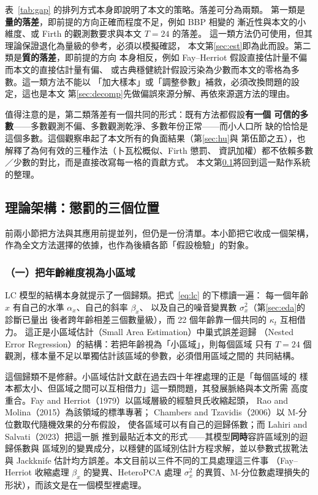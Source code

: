 \documentclass[UTF8, fontset=macnew, a4paper, 12pt]{ctexart}
\newcommand{\cn}[1]{\ding{\number\numexpr171+#1\relax}}
\begin{document}
表~\ref{tab:gap} 的排列方式本身即說明了本文的策略。落差可分為兩類。
第一類是\textbf{量的落差}，即前提的方向正確而程度不足，例如 BBP 相變的
漸近性與本文的小維度、或 Firth 的觀測數要求與本文 $T=24$ 的落差。
這一類方法仍可使用，但其理論保證退化為量級的參考，必須以模擬確認，
本文第\ref{sec:est}即為此而設。第二類是\textbf{質的落差}，即前提的方向
本身相反，例如 Fay--Herriot 假設直接估計量不偏而本文的直接估計量有偏、
或古典穩健統計假設污染為少數而本文的零格為多數。這一類方法不能以
「加大樣本」或「調整參數」補救，必須改換問題的設定，這也是本文
第\ref{sec:decomp}先做偏誤來源分解、再依來源選方法的理由。

值得注意的是，第二類落差有一個共同的形式：既有方法都假設\textbf{有一個
可信的多數}——多數觀測不偏、多數觀測乾淨、多數年份正常——而小人口所
缺的恰恰是這個多數。這個觀察串起了本文所有的負面結果（第\ref{sec:hu}與
第伍節之五），也解釋了為何有效的三種作法（卜瓦松概似、Firth 懲罰、
資訊加權）都不依賴多數／少數的對比，而是直接改寫每一格的貢獻方式。
本文第\ref{sec:theory}將回到這一點作系統的整理。

\subsection{理論架構：懲罰的三個位置}\label{sec:theory}

前兩小節把方法與其應用前提並列，但仍是一份清單。本小節把它收成一個架構，
作為全文方法選擇的依據，也作為後續各節「假設檢驗」的對象。

\subsubsection{（一）把年齡維度視為小區域}\label{sec:sae}

LC 模型的結構本身就提示了一個歸類。把式~\eqref{eq:lc} 的下標讀一遍：
每一個年齡 $x$ 有自己的水準 $\alpha_x$、自己的斜率 $\beta_x$、
以及自己的噪音變異數 $\sigma_x^2$（第\ref{sec:eda}的診斷\cn{3}已量出
後者跨年齡相差三個數量級），而 22 個年齡靠一個共同的 $\kappa_t$ 互相借力。
這正是小區域估計（Small Area Estimation）中巢式誤差迴歸
（Nested Error Regression）的結構：若把年齡視為「小區域」，則每個區域
只有 $T=24$ 個觀測，樣本量不足以單獨估計該區域的參數，必須借用區域之間的
共同結構。

這個歸類不是修辭。小區域估計文獻在過去四十年裡處理的正是「每個區域的
樣本都太小、但區域之間可以互相借力」這一類問題，其發展脈絡與本文所需
高度重合。Fay and Herriot（1979）以區域層級的經驗貝氏收縮起頭，
Rao and Molina（2015）為該領域的標準專著；
Chambers and Tzavidis（2006）以 M-分位數取代隨機效果的分布假設，
使各區域可以有自己的迴歸係數；而 Lahiri and Salvati（2023）把這一脈
推到最貼近本文的形式——其模型\textbf{同時}容許區域別的迴歸係數與
區域別的變異成分，以穩健的區域別估計方程求解，並以參數式拔靴法與
Jackknife 估計均方誤差。本文目前以三件不同的工具處理這三件事
（Fay--Herriot 收縮處理 $\beta_x$ 的變異、HeteroPCA 處理 $\sigma_x^2$
的異質、M-分位數處理損失的形狀），而該文是在一個模型裡處理。
\end{document}
